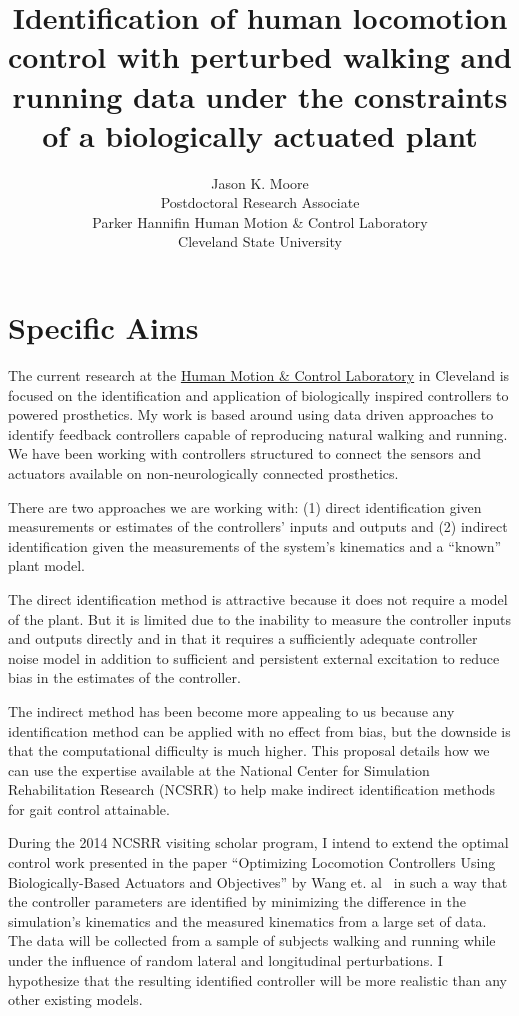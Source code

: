 \documentclass[11pt,twocolumn]{article}
\title{Identification of human locomotion control with perturbed walking and
running data under the constraints of a biologically actuated plant}
\author{Jason K. Moore\\
  Postdoctoral Research Associate\\
  Parker Hannifin Human Motion \& Control Laboratory\\
  Cleveland State University
}
\begin{document}
\maketitle

\section*{Specific Aims}

The current research at the \href{http://hmc.csuohio.edu}{Human Motion \&
Control Laboratory} in Cleveland is focused on the identification and
application of biologically inspired controllers to powered prosthetics. My
work is based around using data driven approaches to identify feedback
controllers capable of reproducing natural walking and running. We have been
working with controllers structured to connect the sensors and actuators
available on non-neurologically connected prosthetics.

There are two approaches we are working with: (1) direct identification given
measurements or estimates of the controllers' inputs and outputs and (2)
indirect identification given the measurements of the system's kinematics and a
``known'' plant model.

The direct identification method is attractive because it does not require a
model of the plant. But it is limited due to the inability to measure the
controller inputs and outputs directly and in that it requires a sufficiently
adequate controller noise model in addition to sufficient and persistent
external excitation to reduce bias in the estimates of the controller.

The indirect method has been become more appealing to us because any
identification method can be applied with no effect from bias, but the downside
is that the computational difficulty is much higher. This proposal details how
we can use the expertise available at the National Center for Simulation
Rehabilitation Research (NCSRR) to help make indirect identification methods
for gait control attainable.

During the 2014 NCSRR visiting scholar program, I intend to extend the optimal
control work presented in the paper ``Optimizing Locomotion Controllers Using
Biologically-Based Actuators and Objectives'' by Wang et. al~\cite{Wang2012} in
such a way that the controller parameters are identified by minimizing the
difference in the simulation's kinematics and the measured kinematics from a
large set of data. The data will be collected from a sample of subjects walking
and running while under the influence of random lateral and longitudinal
perturbations. I hypothesize that the resulting identified controller will be
more realistic than any other existing models.
\end{document}
